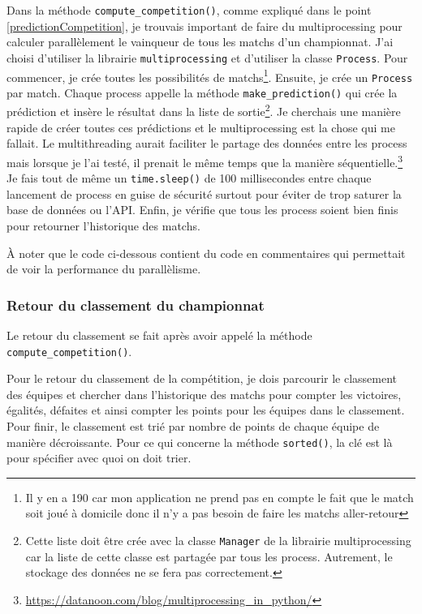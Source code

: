 \documentclass[a4paper,14pt]{extarticle}
\begin{document}
{Dans la méthode \texttt{compute\_competition()}, comme expliqué dans le point \ref{predictionCompetition}, je trouvais important de faire du multiprocessing pour calculer parallèlement le vainqueur de tous les matchs d'un championnat. J'ai choisi d'utiliser la librairie \texttt{multiprocessing} et d'utiliser la classe \texttt{Process}.
Pour commencer, je crée toutes les possibilités de matchs\footnote{Il y en a 190 car mon application ne prend pas en compte le fait que le match soit joué à domicile donc il n'y a pas besoin de faire les matchs aller-retour}. Ensuite, je crée un \texttt{Process} par match. Chaque process appelle la méthode \texttt{make\_prediction()} qui crée la prédiction et insère le résultat dans la liste de sortie\footnote{Cette liste doit être crée avec la classe \texttt{Manager} de la librairie multiprocessing car la liste de cette classe est partagée par tous les process. Autrement, le stockage des données ne se fera pas correctement.}. Je cherchais une manière rapide de créer toutes ces prédictions et le multiprocessing est la chose qui me fallait. Le multithreading aurait faciliter le partage des données entre les process mais lorsque je l'ai testé, il prenait le même temps que la manière séquentielle.\footnote{\url{https://datanoon.com/blog/multiprocessing_in_python/}}
Je fais tout de même un \texttt{time.sleep()} de 100 millisecondes entre chaque lancement de process en guise de sécurité surtout pour éviter de trop saturer la base de données ou l'API.
Enfin, je vérifie que tous les process soient bien finis pour retourner l'historique des matchs.

À noter que le code ci-dessous contient du code en commentaires qui permettait de voir la performance du parallèlisme.


\subsubsection{Retour du classement du championnat}

Le retour du classement se fait après avoir appelé la méthode \newline \texttt{compute\_competition()}.

Pour le retour du classement de la compétition, je dois parcourir le classement des équipes et chercher dans l'historique des matchs pour compter les victoires, égalités, défaites et ainsi compter les points pour les équipes dans le classement. Pour finir, le classement est trié par nombre de points de chaque équipe de manière décroissante. Pour ce qui concerne la méthode \texttt{sorted()}, la clé est là pour spécifier avec quoi on doit trier.

}
\end{document}
